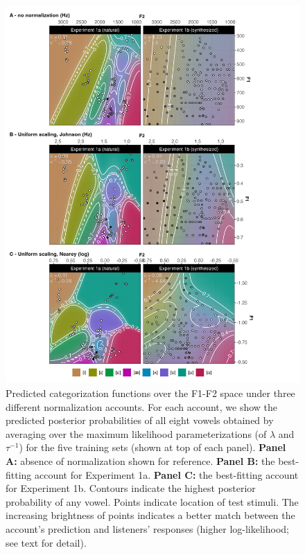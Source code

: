 \documentclass[preprint]{JASA}
\begin{document}
\begin{figure}[!ht]

{\centering \includegraphics[width=0.8\linewidth]{./Figure10} 

}

\caption{Predicted categorization functions over the F1-F2 space under three different normalization accounts. For each account, we show the predicted posterior probabilities of all eight vowels obtained by averaging over the maximum likelihood parameterizations (of \(\lambda\) and \(\tau^{-1}\)) for the five training sets (shown at top of each panel). \textbf{Panel A:} absence of normalization shown for reference. \textbf{Panel B:} the best-fitting account for Experiment 1a. \textbf{Panel C:} the best-fitting account for Experiment 1b. Contours indicate the highest posterior probability of any vowel. Points indicate location of test stimuli. The increasing brightness of points indicates a better match between the account's prediction and listeners' responses (higher log-likelihood; see text for detail).}\label{fig:prediction-landscapes-optim-io}
\end{figure}
\end{document}
